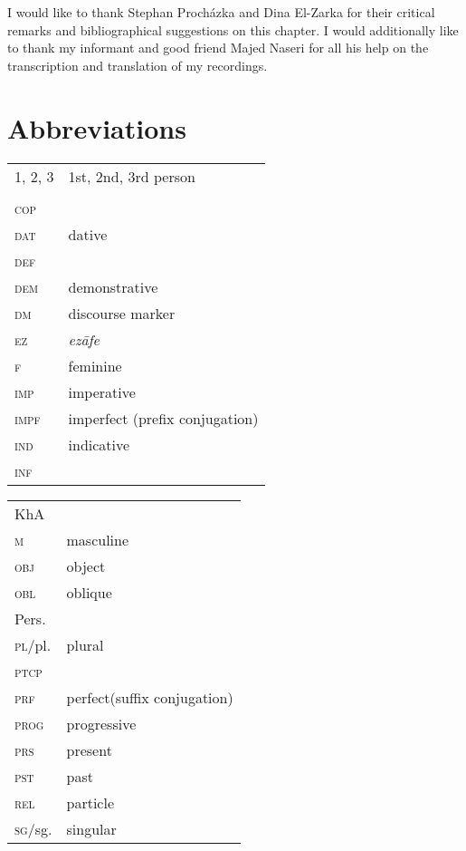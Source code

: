 \documentclass[output=paper,nonflat]{langsci/langscibook}
\begin{document}
I would like to thank Stephan Procházka and Dina El-Zarka for their critical remarks and bibliographical suggestions on this chapter. I would additionally like to thank my informant and good friend Majed Naseri for all his help on the transcription and translation of my recordings.

\section*{Abbreviations}

\begin{tabularx}{.55\textwidth}{@{}lQ@{}}
\textsc{1, 2, 3} & 1st, 2nd, 3rd person \\
 &  \\
\textsc{cop} & \\
\textsc{dat} & dative\\
\textsc{def} & \\
\textsc{dem} & demonstrative\\
\textsc{dm} & discourse marker\\
\textsc{ez} &  \textit{ezāfe}\\
\textsc{f} & feminine\\
\textsc{imp} & imperative\\
\textsc{impf} & imperfect (prefix conjugation)\\
\textsc{ind} & indicative\\
\textsc{inf} & \\
\end{tabularx}%
\begin{tabularx}{.5\textwidth}{@{}lQ@{}}
KhA &  \\
\textsc{m} & masculine\\
\textsc{obj} & object\\
\textsc{obl} & oblique\\
Pers. & \\
\textsc{pl}/pl. & plural\\
\textsc{ptcp} & \\
\textsc{prf} & perfect(suffix conjugation)\\
\textsc{prog} & progressive\\
\textsc{prs} & present\\
\textsc{pst} & past\\
\textsc{rel} &  particle\\
\textsc{sg}/sg. & singular\\
\end{tabularx}%




\sloppy\printbibliography[heading=subbibliography,notkeyword=this]
\end{document}
